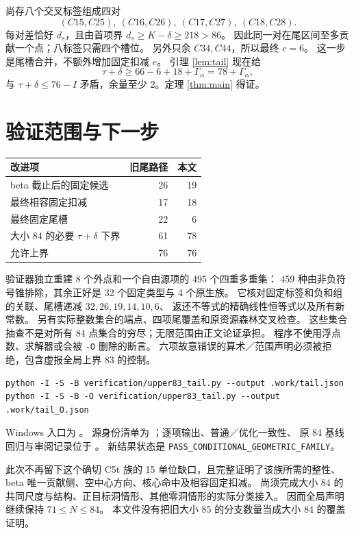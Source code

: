 \documentclass[11pt,a4paper]{article}
\begin{document}
尚存八个交叉标签组成四对
\[(C15,C25),\ (C16,C26),\ (C17,C27),\ (C18,C28).\]
每对差恰好 $d_s$，且由首项界 $d_s\ge K-\delta\ge218>86$。
因此同一对在尾区间至多贡献一个点；八标签只需四个槽位。
另外只余 $C34,C44$，所以最终 $c=6$。
这一步是尾槽合并，不额外增加固定扣减 $e$。
引理 \ref{lem:tail} 现在给
\[\boxed{\tau+\delta\ge66-6+18+\Gamma_\alpha=78+\Gamma_\alpha,}\]
与 $\tau+\delta\le76-I$ 矛盾，余量至少 2。定理 \ref{thm:main} 得证。

\clearpage
\section{验证范围与下一步}
\begin{center}
\begin{tabular}{lrr}
\toprule 改进项 & 旧尾路径 & 本文\\\midrule
beta 截止后的固定候选 &26&19\\
最终相容固定扣减 &17&18\\
最终固定尾槽 &22&6\\
大小 84 的必要 $\tau+\delta$ 下界 &61&78\\
允许上界 &76&76\\\bottomrule
\end{tabular}
\end{center}
验证器独立重建 8 个外点和一个自由源项的 495 个四重多重集：
459 种由非负符号锥排除，其余正好是 32 个固定类型与 4 个原生族。
它核对固定标签和负和组的关联、尾槽递减 $32,26,19,14,10,6$、
返还不等式的精确线性恒等式以及所有新常数。
另有实际整数集合的端点、四项尾覆盖和原资源森林交叉检查。
这些集合抽查不是对所有 84 点集合的穷尽；无限范围由正文论证承担。
程序不使用浮点数、求解器或会被 \texttt{-O} 删除的断言。
六项故意错误的算术／范围声明必须被拒绝，包含虚报全局上界 83 的控制。

\begin{verbatim}
python -I -S -B verification/upper83_tail.py --output .work/tail.json
python -I -S -B -O verification/upper83_tail.py --output .work/tail_O.json
\end{verbatim}
Windows 入口为 。
源身份清单为 ；逐项输出、普通／优化一致性、
原 84 基线回归与审阅记录位于 。
新结果状态是 \texttt{PASS\_CONDITIONAL\_GEOMETRIC\_FAMILY}。

此次不再留下这个确切 C5t 族的 15 单位缺口，且完整证明了该族所需的整性、
beta 唯一贡献侧、空中心方向、核心命中及相容固定扣减。
尚须完成大小 84 的共同尺度与结构、正目标洞情形、其他零洞情形的实际分类接入。
因而全局声明继续保持 $71\le N\le84$。
本文件没有把旧大小 85 的分支数量当成大小 84 的覆盖证明。
\end{document}
